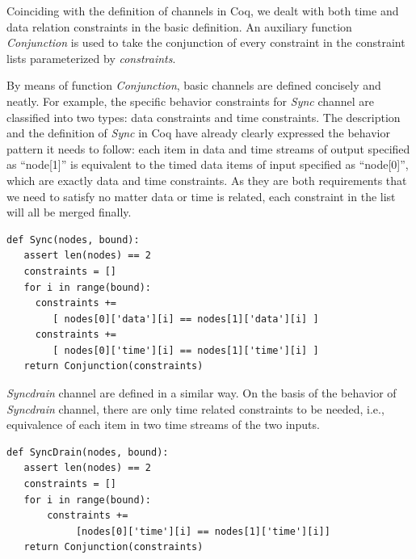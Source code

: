 \documentclass[preprint,3p]{elsarticle}
\begin{document}
Coinciding with the definition of channels in Coq, we dealt with both time and data relation constraints in the basic definition. An auxiliary function \emph{Conjunction} is used to take the conjunction of every constraint in the constraint lists parameterized by \emph{constraints}.

By means of function \emph{Conjunction}, basic channels are defined concisely and neatly. For example, the specific behavior constraints for \emph{Sync} channel are classified into two types: data constraints and time constraints. The description and the definition of \emph{Sync} in Coq have already clearly expressed the behavior pattern it needs to follow: each item in data and time streams of output specified as ``node[1]'' is equivalent to the timed data items of input specified as ``node[0]'', which are exactly data and time constraints. As they are both requirements that we need to satisfy no matter data or time is related, each constraint in the list will all be merged finally.
\begin{lstlisting}[frame=single]
def Sync(nodes, bound):
   assert len(nodes) == 2
   constraints = []
   for i in range(bound):
     constraints +=
        [ nodes[0]['data'][i] == nodes[1]['data'][i] ]
     constraints +=
        [ nodes[0]['time'][i] == nodes[1]['time'][i] ]
   return Conjunction(constraints)
\end{lstlisting}

\emph{Syncdrain} channel are defined in a similar way. On the basis of the behavior of \emph{Syncdrain} channel, there are only time related constraints to be needed, i.e., equivalence of each item in two time streams of the two inputs.
\begin{lstlisting}[frame=single]
def SyncDrain(nodes, bound):
   assert len(nodes) == 2
   constraints = []
   for i in range(bound):
       constraints +=
            [nodes[0]['time'][i] == nodes[1]['time'][i]]
   return Conjunction(constraints)
\end{lstlisting}
\end{document}
